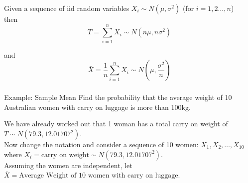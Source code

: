 \documentclass[t,xcolor=pdftex,dvipsnames,table]{beamer}
\begin{document}
\begin{frame}{}
\begin{definition}
Given a sequence of iid random variables $X_{i} \sim N(\mu, \sigma^2)$
(for $i=1,2\ldots,n$) \\

then  \[  \boxed{ T = \sum_{i=1}^{n} X_{i}  \sim N( n \mu , n \sigma^2  ) } \]

and
\[  \boxed{ \bar{X} = \frac{1}{n} \sum_{i=1}^{n} X_{i}  \sim N( \mu, \frac{\sigma^2}{n} ) } \]

\end{definition}
\end{frame}


\begin{frame}[fragile]\frametitle{}

\begin{block}{Example: Sample Mean}
Find the probability that the average weight of 10 Australian women with carry on luggage is more than 100kg.
\end{block}

\vspace{.5cm}
We have already worked out that 1 woman has a total carry on weight of $T \sim N(79.3, 12.01707^2)$. \\

\vspace{.5cm}
Now change the notation and consider a sequence of 10 women: $X_{1}, X_{2}, \ldots, X_{10}$ where $X_{i} = \mbox{carry on weight} \sim N(79.3, 12.01707^2)$. \\

\vspace{.5cm}
Assuming the women are independent, let $\bar{X} = \mbox{Average Weight of 10 women with carry on luggage}$. \\

\end{frame}
\end{document}
